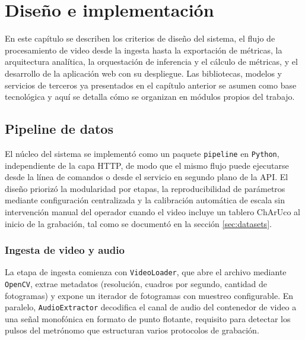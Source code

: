 
\chapter{Diseño e implementación}

\label{Chapter3}

En este capítulo se describen los criterios de diseño del sistema, el flujo de procesamiento de video desde la ingesta hasta la exportación de métricas, la arquitectura analítica, la orquestación de inferencia y el cálculo de métricas, y el desarrollo de la aplicación web con su despliegue. Las bibliotecas, modelos y servicios de terceros ya presentados en el capítulo anterior se asumen como base tecnológica y aquí se detalla cómo se organizan en módulos propios del trabajo.


\section{Pipeline de datos}
\label{sec:pipeline}

El núcleo del sistema se implementó como un paquete \texttt{pipeline} en \texttt{Python}, independiente de la capa HTTP, de modo que el mismo flujo puede ejecutarse desde la línea de comandos o desde el servicio en segundo plano de la API. El diseño priorizó la modularidad por etapas, la reproducibilidad de parámetros mediante configuración centralizada y la calibración automática de escala sin intervención manual del operador cuando el video incluye un tablero ChArUco al inicio de la grabación, tal como se documentó en la sección \ref{sec:datasets}.

\subsection{Ingesta de video y audio}

La etapa de ingesta comienza con \texttt{VideoLoader}, que abre el archivo mediante \texttt{OpenCV}, extrae metadatos (resolución, cuadros por segundo, cantidad de fotogramas) y expone un iterador de fotogramas con muestreo configurable. En paralelo, \texttt{AudioExtractor} decodifica el canal de audio del contenedor de video a una señal monofónica en formato de punto flotante, requisito para detectar los pulsos del metrónomo que estructuran varios protocolos de grabación.

